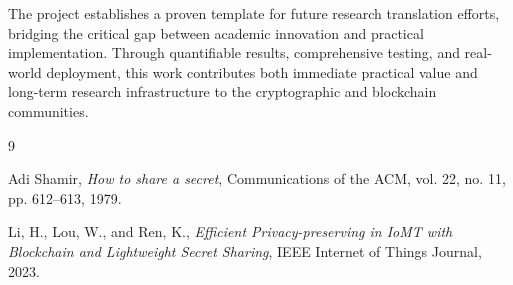 \documentclass[12pt,a4paper]{article}
\begin{document}
The project establishes a proven template for future research translation efforts, bridging the critical gap between academic innovation and practical implementation. Through quantifiable results, comprehensive testing, and real-world deployment, this work contributes both immediate practical value and long-term research infrastructure to the cryptographic and blockchain communities.

\clearpage
\begin{thebibliography}{9}

Adi Shamir,
\textit{How to share a secret},
Communications of the ACM, vol. 22, no. 11, pp. 612–613, 1979.

Li, H., Lou, W., and Ren, K.,
\textit{Efficient Privacy-preserving in IoMT with Blockchain and Lightweight Secret Sharing},
IEEE Internet of Things Journal, 2023.

\end{thebibliography}
\end{document}
